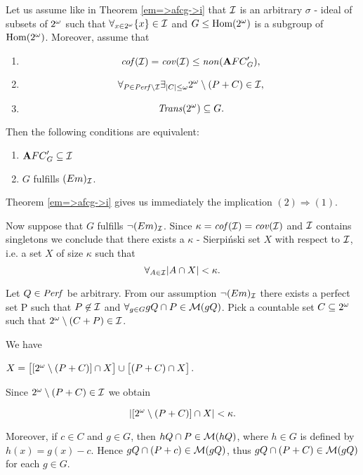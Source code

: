 \begin{theorem}
\label{em<=>afcg->i}
  Let us assume like in Theorem \ref{em=>afcg->i}
that ${\cal I}$ is an arbitrary $\sigma$ - ideal of subsets of $2^{\omega}$
such that $\forall_{x\in2^{\omega}} \lbrace x \rbrace \in {\cal I}$ and
$G \leq {\rm Hom(2^{\omega})}$ is a subgroup of ${\rm Hom(2^{\omega})}$.
  Moreover, assume that
\begin{enumerate}
  \item
    \[ {\it cof}({\cal I}) = {\it cov}({\cal I}) \leq {\it non}({\mathbf AFC}^\prime_{G}), \]
  \item
    \[ \forall_{P\in{\it Perf}\setminus{\cal I}} \exists_{|C| \leq \omega}
      2^{\omega} \setminus (P + C) \in {\cal I}, \]
  \item
    \[ {\it Trans}(2^{\omega}) \subseteq G. \]
\end{enumerate}

Then the following conditions are equivalent:

\begin{enumerate}
  \item
    ${\mathbf AFC}^\prime_{G} \subseteq {\cal I}$
  \item
    $G$ fulfills $(Em)_{{\cal I}}$.
\end{enumerate}
\end{theorem}

\proof

Theorem \ref{em=>afcg->i}
gives us immediately the implication $(2) \Rightarrow (1)$.


  Now suppose that $G$ fulfills $\neg (Em)_{{\cal I}}$.
Since $\kappa = {\it cof}({\cal I}) = {\it cov}({\cal I})$
and ${\cal I}$ contains singletons we conclude that
there exists a $\kappa$ - Sierpi\'nski set $X$ with
respect to ${\cal I}$, i.e. a set $X$ of size
$\kappa$ such that
  \[
    \forall_{A \in {\cal I}} |A \cap X| < \kappa.
  \]



Let $Q \in {\it Perf}$ be arbitrary.
From our assumption $\neg (Em)_{{\cal I}}$
there exists a perfect set P
such that $P \not\in {\cal I}$ and
$\forall_{g \in G} gQ \cap P \in {\cal M}(gQ)$.
  Pick a countable set $C \subseteq 2^{\omega}$ such that
$2^{\omega} \setminus (C+P) \in {\cal I}$.

We have

$X =
  \big[ [2^{\omega} \setminus (P+C) ] \cap X \big]
\cup
  \big[ (P+C) \cap X \big]$.

Since $2^{\omega} \setminus (P + C) \in {\cal I}$ we obtain

\[ | [ 2^{\omega} \setminus (P + C) ] \cap X | < \kappa. \]

Moreover, if $c \in C$ and $g \in G$, then
$hQ \cap P \in {\cal M}(hQ)$,
where $h \in G$ is defined by $h(x) = g(x) - c$.
  Hence $gQ \cap (P + c) \in {\cal M}(gQ)$,
thus
  $gQ \cap (P + C) \in {\cal M}(gQ)$ for each $g \in G$.

